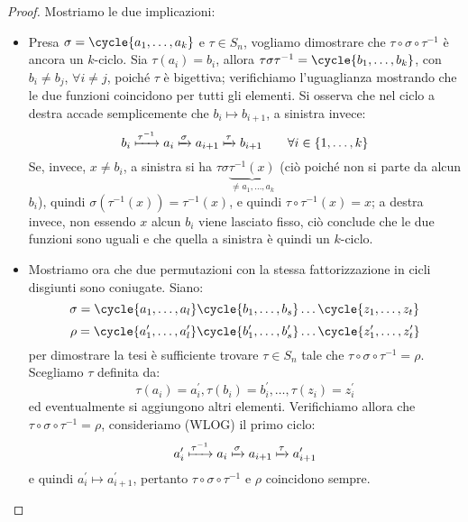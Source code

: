 \documentclass[11pt]{scrartcl}
\begin{document}
\begin{proof}
    Mostriamo le due implicazioni:
        \begin{itemize}
            \item Presa $\sigma = \cycle{a_1,\ldots,a_k}$ e $\tau \in S_n$, vogliamo dimostrare che $\tau\circ\sigma\circ\tau^{-1}$ è ancora un $k$-ciclo.
                Sia $\tau(a_i) = b_i$, allora $\tau\sigma\tau^{-1} = \cycle{b_1,\ldots,b_k}$, con $b_i \ne b_j$, $\forall i \ne j$, poiché $\tau$ è bigettiva; verifichiamo
                l'uguaglianza mostrando che le due funzioni coincidono per tutti gli elementi. Si osserva che nel ciclo a destra accade semplicemente che $b_i \longmapsto b_{i+1}$, a sinistra invece:
                    \[ b_i \xmapsto{\tau^{-1}} a_i \xmapsto{\sigma} a_{i+1} \xmapsto{\tau} b_{i+1} \qquad \forall i \in \{1,\ldots,k\}
                        \]
                Se, invece, $x \ne b_i$, a sinistra si ha $\tau\sigma\underbrace{\tau^{-1}(x)}_{\ne a_1,\ldots,a_k}$ (ciò poiché non si parte da alcun $b_i$), quindi $\sigma(\tau^{-1}(x)) = \tau^{-1}(x)$, e quindi
                $\tau \circ \tau^{-1} (x) = x$; a destra invece, non essendo $x$ alcun $b_i$ viene lasciato fisso, ciò conclude che le due funzioni sono uguali e che quella a sinistra è quindi un $k$-ciclo.
            \item Mostriamo ora che due permutazioni con la stessa fattorizzazione in cicli disgiunti sono coniugate. Siano:
                \[ \sigma = \cycle{a_1, \ldots, a_l}\cycle{b_1, \ldots, b_s} \ldots \cycle{z_1, \ldots, z_t}
                    \]\[ \rho = \cycle{a_1^{\prime}, \ldots, a_l^{\prime}}\cycle{b_1^{\prime}, \ldots, b_s^{\prime}} \ldots \cycle{z_1^{\prime}, \ldots, z_t^{\prime}}
                        \]
                per dimostrare la tesi è sufficiente trovare $\tau \in S_n$ tale che $\tau\circ\sigma\circ\tau^{-1} = \rho$. Scegliamo $\tau$ definita da:
                    \[ \tau(a_i) = a_i^{\prime}, \tau(b_i) = b_i^{\prime}, \ldots, \tau(z_i) = z_i^{\prime}
                        \]
                ed eventualmente si aggiungono altri elementi. Verifichiamo allora che $\tau\circ\sigma\circ\tau^{-1} = \rho$, consideriamo (WLOG) il primo ciclo:
                    \[ a_i^{\prime} \xmapsto{\tau^{-1}} a_i \xmapsto{\sigma} a_{i+1} \xmapsto{\tau} a_{i+1}^{\prime}
                        \]
                e quindi $a_i^{\prime} \longmapsto a_{i+1}^{\prime}$, pertanto $\tau\circ\sigma\circ\tau^{-1}$ e $\rho$ coincidono sempre.
        \end{itemize}
\end{proof}
\end{document}
